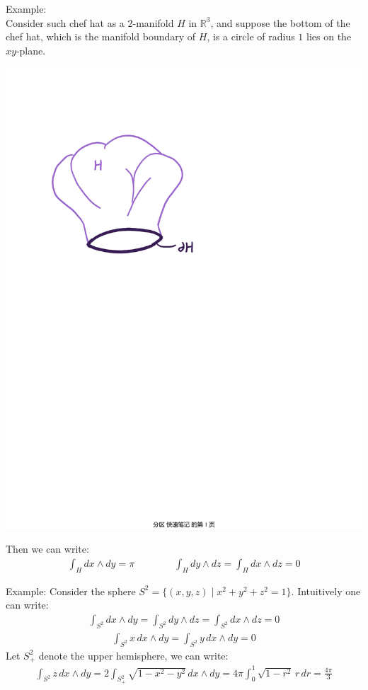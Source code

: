 \documentclass[11pt,oneside]{book}
\theoremstyle{break}
\theoremstyle{break}
\newcommand{\R}{\mathbb{R}}
\newcommand{\example}{\color{green}Example: \color{black}}
\begin{document}
\example\\
Consider such chef hat as a $2$-manifold $H$ in $\R^3$, and suppose the bottom of the chef hat, which is the manifold boundary of $H$, is a circle of radius $1$ lies on the $xy$-plane. 
\begin{center}
\includegraphics[scale=0.65]{chef-hat.pdf}\\
\end{center}
Then we can write:
\begin{align*}
\int_H dx\wedge dy = \pi \qquad\qquad \int_H dy \wedge dz = \int_H dx\wedge dz = 0
\end{align*} 

\hfill\break\hfill\break\hfill\break
\example Consider the sphere $S^2= \{(x,y,z)\mid x^2+y^2+z^2 = 1\}$. Intuitively one can write:
\begin{align*}
\int_{S^2} dx\wedge dy  = \int_{S^2} dy\wedge dz = \int_{S^2} dx\wedge dz = 0
\end{align*}
\begin{align*}
\int_{S^2} x\, dx\wedge dy = \int_{S^2} y \, dx\wedge dy = 0
\end{align*}
Let $S^2_+$ denote the upper hemisphere, we can write:
\begin{align*}
\int_{S^2} z \, dx\wedge dy = 2\int_{S^2_+} \sqrt{1-x^2-y^2} \, dx\wedge dy = 4\pi \int_0^1 \sqrt{1-r^2}\, r \, dr = \frac{4\pi}{3}
\end{align*}
\end{document}
